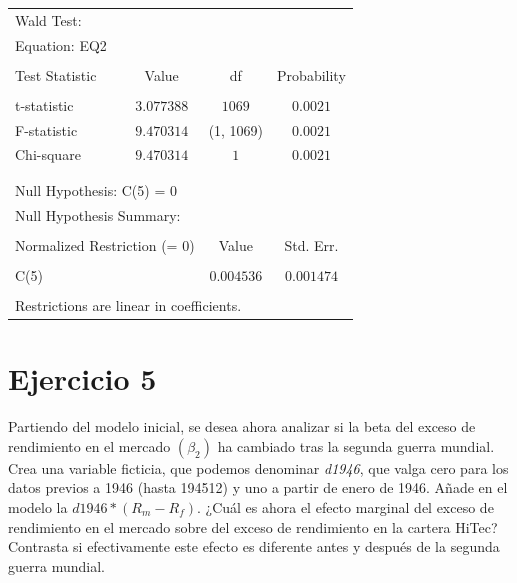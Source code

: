 \documentclass[12pt]{article}
\numberwithin{equation}{section} %
\begin{document}
\begin{table}[H]
\centering
\begin{tabular}{lrrr}
\multicolumn{1}{l}{Wald Test:}&\multicolumn{1}{c}{}&\multicolumn{1}{c}{}&\multicolumn{1}{c}{}\\
\multicolumn{2}{l}{Equation: EQ2}&\multicolumn{1}{c}{}&\multicolumn{1}{c}{}\\
[4.5pt] \hline \\ [-4.5pt]
\multicolumn{1}{l}{Test Statistic}&\multicolumn{1}{c}{Value}&\multicolumn{1}{c}{df}&\multicolumn{1}{c}{Probability}\\
[4.5pt] \hline \\ [-4.5pt]
\multicolumn{1}{l}{t-statistic}&\multicolumn{1}{c}{$3.077388$}&\multicolumn{1}{c}{$1069$}&\multicolumn{1}{c}{$0.0021$}\\
\multicolumn{1}{l}{F-statistic}&\multicolumn{1}{c}{$9.470314$}&\multicolumn{1}{c}{(1, 1069)}&\multicolumn{1}{c}{$0.0021$}\\
\multicolumn{1}{l}{Chi-square}&\multicolumn{1}{c}{$9.470314$}&\multicolumn{1}{c}{$1$}&\multicolumn{1}{c}{$0.0021$}\\
[4.5pt] \hline \\ [-4.5pt]
\multicolumn{1}{c}{}&\multicolumn{1}{c}{}&\multicolumn{1}{c}{}&\multicolumn{1}{c}{}\\
\multicolumn{2}{l}{Null Hypothesis: C(5) = 0}&\multicolumn{1}{c}{}&\multicolumn{1}{c}{}\\
\multicolumn{2}{l}{Null Hypothesis Summary:}&\multicolumn{1}{c}{}&\multicolumn{1}{c}{}\\
[4.5pt] \hline \\ [-4.5pt]
\multicolumn{2}{l}{Normalized Restriction (= 0)}&\multicolumn{1}{c}{Value}&\multicolumn{1}{c}{Std. Err.}\\
[4.5pt] \hline \\ [-4.5pt]
\multicolumn{2}{l}{C(5)}&\multicolumn{1}{c}{$0.004536$}&\multicolumn{1}{c}{$0.001474$}\\
[4.5pt] \hline \\ [-4.5pt]
\multicolumn{3}{l}{Restrictions are linear in coefficients.}&\multicolumn{1}{c}{}\\
\end{tabular}
\end{table}


\section{Ejercicio 5} Partiendo del modelo inicial, se desea ahora analizar si la beta del exceso de rendimiento en el mercado $(\beta_2)$ ha cambiado tras la segunda guerra mundial. Crea una variable ficticia, que podemos denominar \textit{d1946}, que valga cero para los datos previos a 1946 (hasta 194512) y uno a partir de enero de 1946. Añade en el modelo la $d1946*(R_m-R_f)$. ¿Cuál es ahora el efecto marginal del exceso de rendimiento en el mercado sobre del exceso de rendimiento en la cartera HiTec? Contrasta si efectivamente este efecto es diferente antes y después de la segunda guerra mundial.
\end{document}
